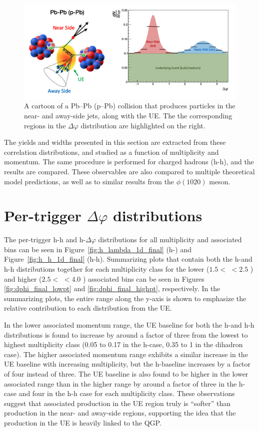 \begin{figure}
\includegraphics[width=\textwidth]{figures/mnm/dphi_cartoon.png}
\caption{A cartoon of a Pb--Pb (p--Pb) collision that produces particles in the near- and away-side jets, along with the UE. The the corresponding regions in the $\Delta\varphi$ distribution are highlighted on the right.}
\label{fig:dphi_cartoon_ref}
\end{figure}

The yields and widths presented in this section are extracted from these correlation distributions, and studied as a function of multiplicity and \lmb momentum. The same procedure is performed for charged hadrons (h-h), and the results are compared. These observables are also compared to multiple theoretical model predictions, as well as to similar results from the $\phi(1020)$ meson.

\section{Per-trigger $\Delta\varphi$ distributions}

The per-trigger h-h and h-\lmb $\Delta\varphi$ distributions for all multiplicity and associated \pt bins can be seen in Figure~\ref{fig:h_lambda_1d_final} (h-\lmb) and Figure~\ref{fig:h_h_1d_final} (h-h). Summarizing plots that contain both the h-\lmb and h-h distributions together for each multiplicity class for the lower ($1.5 <$ \pt $< 2.5$ \GeVc) and higher ($2.5 < $ \pt $< 4.0$ \GeVc) associated \pt bins can be seen in Figures \ref{fig:dphi_final_lowpt} and \ref{fig:dphi_final_highpt}, respectively. In the summarizing plots, the entire range along the y-axis is shown to emphasize the relative contribution to each distribution from the UE. 

In the lower associated momentum range, the UE baseline for both the h-\lmb and h-h distributions is found to increase by around a factor of three from the lowest to highest multiplicity class (0.05 to 0.17 in the h-\lmb case, 0.35 to 1 in the dihadron case). The higher associated momentum range exhibits a similar increase in the UE baseline with increasing multiplicity, but the h-\lmb baseline increases by a factor of four instead of three. The UE baseline is also found to be higher in the lower associated \pt range than in the higher range by around a factor of three in the h-\lmb case and four in the h-h case for each multiplicity class. These observations suggest that associated production in the UE region truly is ``softer'' than production in the near- and away-side regions, supporting the idea that the production in the UE is heavily linked to the QGP.

